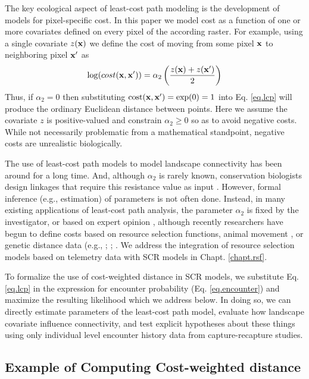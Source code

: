 The key ecological aspect of least-cost path modeling is the
development
of models for pixel-specific cost.
In this paper we model cost as a function of one or more covariates
defined on every pixel of the according raster. For example, using a
single covariate $z({\bf x})$ we define the cost of moving from some pixel
${\bf x}$ to neighboring pixel ${\bf x}'$ as
\begin{equation}
\log(  cost({\bf x},{\bf x}'))=  \alpha_{2}\left( \frac{z({\bf
      x})+z({\bf x}')}{2}
\right)
\label{ecoldist.eq.cost}
\end{equation}
Thus, if $\alpha_{2} = 0$ then substituting $\mbox{cost}({\bf x},{\bf x}')
=\exp(0) = 1$ into
Eq. \ref{eq.lcp} will produce the ordinary Euclidean distance
between points. Here we assume the covariate $z$ is positive-valued
and constrain $\alpha_{2}\ge 0$ so as to avoid
negative costs. While not necessarily problematic from a mathematical
standpoint, negative costs are unrealistic biologically. 

The use of least-cost path models to model landscape connectivity has
been around for a long time. And, although $\alpha_{2}$ is rarely
known, conservation biologists design linkages that require this
resistance value as input \citep[see][and articles cited
therein]{beier_etal:2008}.  However, formal inference (e.g.,
estimation) of parameters is not often done.  Instead, in many
existing applications of least-cost path analysis, the parameter
$\alpha_{2}$ is fixed by the investigator, or based on expert opinion
\citep{beier_etal:2008}, although recently researchers have begun to
define costs based on resource selection functions, animal movement
\citep{tracy:2006, fortin_etal:2005}, or genetic distance data (e.g.,
\citet{gerlach_musolf:2000}; \citet{epps_etal:2007};
\citet{schwartz_etal:2009}. We address the integration of resource
selection models based on telemetry data with SCR models in Chapt. \ref{chapt.rsf}.

To formalize the use of cost-weighted distance in SCR models, we 
substitute Eq. \ref{eq.lcp} in the expression for encounter
probability (Eq. \ref{eq.encounter}) and maximize the resulting
likelihood which we address below. In doing so, we can directly 
estimate parameters of the least-cost path model, evaluate how 
landscape covariate influence connectivity, and test explicit hypotheses
about these things using only individual level encounter history data
from capture-recapture studies.




\subsection{Example of Computing Cost-weighted distance}

